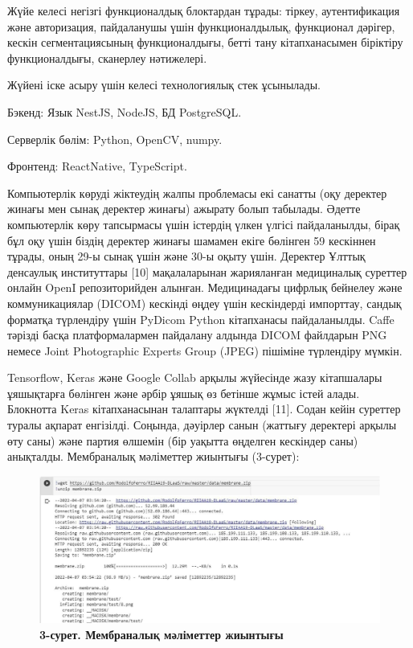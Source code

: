 \begin{multicols}{2}

Жүйе келесі негізгі функционалдық блоктардан тұрады: тіркеу,
аутентификация және авторизация, пайдаланушы үшін функционалдылық,
функционал дәрігер, кескін сегментациясының функционалдығы, бетті тану
кітапханасымен біріктіру функционалдығы, сканерлеу нәтижелері.

Жүйені іске асыру үшін келесі технологиялық стек ұсынылады.

Бэкенд: Язык NestJS, NodeJS, БД PostgreSQL.

Серверлік бөлім: Python, OpenCV, numpy.

Фронтенд: ReactNative, TypeScript.

Компьютерлік көруді жіктеудің жалпы проблемасы екі санатты (оқу деректер
жинағы мен сынақ деректер жинағы) ажырату болып табылады. Әдетте
компьютерлік көру тапсырмасы үшін істердің үлкен үлгісі пайдаланылды,
бірақ бұл оқу үшін біздің деректер жинағы шамамен екіге бөлінген 59
кескіннен тұрады, оның 29-ы сынақ үшін және 30-ы оқыту үшін. Деректер
Ұлттық денсаулық институттары {[}10{]} мақалаларынан жарияланған
медициналық суреттер онлайн OpenI репозиторийден алынған. Медицинадағы
цифрлық бейнелеу және коммуникациялар (DICOM) кескінді өңдеу үшін
кескіндерді импорттау, сандық форматқа түрлендіру үшін PyDicom Python
кітапханасы пайдаланылды. Caffe тәрізді басқа платформалармен пайдалану
алдында DICOM файлдарын PNG немесе Joint Photographic Experts Group
(JPEG) пішіміне түрлендіру мүмкін.

Tensorflow, Keras және Google Collab арқылы жүйесінде жазу кітапшалары
ұяшықтарға бөлінген және әрбір ұяшық өз бетінше жұмыс істей алады.
Блокнотта Keras кітапханасынан талаптары жүктелді {[}11{]}. Содан кейін
суреттер туралы ақпарат енгізілді. Соңында, дәуірлер санын (жаттығу
деректері арқылы өту саны) және партия өлшемін (бір уақытта өңделген
кескіндер саны) анықталды. Мембраналық мәліметтер жиынтығы (3-сурет):
\end{multicols}

\begin{figure}[H]
	\centering
	\includegraphics[width=1\textwidth]{assets/193}
	\caption*{\bfseries 3-сурет. Мембраналық мәліметтер жиынтығы}
\end{figure}

